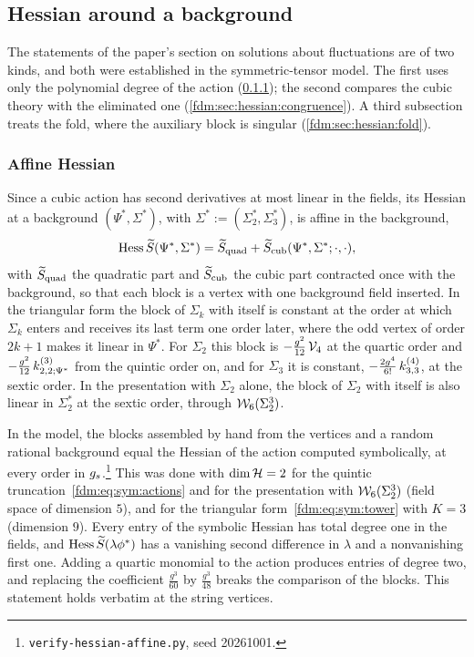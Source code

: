 \subsection{Hessian around a background}
\label{fdm:sec:hessian}

The statements of the paper's section on solutions about fluctuations are of two kinds, and both were established in the symmetric-tensor model.
The first uses only the polynomial degree of the action (\cref{fdm:sec:hessian:affine}); the second compares the cubic theory with the eliminated one (\cref{fdm:sec:hessian:congruence}).
A third subsection treats the fold, where the auxiliary block is singular (\cref{fdm:sec:hessian:fold}).

\subsubsection{Affine Hessian}
\label{fdm:sec:hessian:affine}

Since a cubic action has second derivatives at most linear in the fields, its Hessian at a background $(\Psi^*, \Sigma^*)$, with $\Sigma^* := (\Sigma_2^*, \Sigma_3^*)$, is affine in the background,
\begin{equation}
  \label{fdm:eq:fm:affine}
  \Hess \caction (\Psi^*, \Sigma^*)
    = \caction[\mathrm{quad}] + \caction[\mathrm{cub}](\Psi^*, \Sigma^*; \cdot, \cdot),
\end{equation}
with $\caction[\mathrm{quad}]$ the quadratic part and $\caction[\mathrm{cub}]$ the cubic part contracted once with the background, so that each block is a vertex with one background field inserted.
In the triangular form the block of $\Sigma_k$ with itself is constant at the order at which $\Sigma_k$ enters and receives its last term one order later, where the odd vertex of order $2k+1$ makes it linear in $\Psi^*$.
For $\Sigma_2$ this block is $- \tfrac{g^2}{12} \, \vertex{4}$ at the quartic order and $- \tfrac{g^2}{12} \, \kin{2}{\Psi^*}{3}$ from the quintic order on, and for $\Sigma_3$ it is constant, $- \tfrac{2 g^4}{6!} \, \kin{3}{}{4}$, at the sextic order.
In the presentation with $\Sigma_2$ alone, the block of $\Sigma_2$ with itself is also linear in $\Sigma_2^*$ at the sextic order, through $\dvertex{6}(\Sigma_2^3)$.

In the model, the blocks assembled by hand from the vertices and a random rational background equal the Hessian of the action computed symbolically, at every order in $\gs$.\footnote{\texttt{verify-hessian-affine.py}, seed 20261001.}
This was done with $\dim \Hs = 2$ for the quintic truncation~\eqref{fdm:eq:sym:actions} and for the presentation with $\dvertex{6}(\Sigma_2^3)$ (field space of dimension $5$), and for the triangular form~\eqref{fdm:eq:sym:tower} with $K = 3$ (dimension $9$).
Every entry of the symbolic Hessian has total degree one in the fields, and $\Hess \caction(\lambda \phi^*)$ has a vanishing second difference in $\lambda$ and a nonvanishing first one.
Adding a quartic monomial to the action produces entries of degree two, and replacing the coefficient $\tfrac{g^3}{60}$ by $\tfrac{g^3}{48}$ breaks the comparison of the blocks.
This statement holds verbatim at the string vertices.

